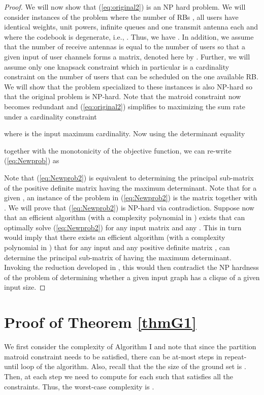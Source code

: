 \documentclass[11pt] {article}
\begin{document}
\begin{proof}
We will now show that (\ref{eq:original2}) is an NP hard problem.
We will consider instances of the problem where the number of RBs ,  all users have identical weights, unit powers, infinite queues and one transmit antenna each and where the codebook  is degenerate, i.e., .  Thus, we have . In addition, we assume that the number of receive antennas is equal to the number of users  so that a given  input of user channels forms a  matrix, denoted here by . Further, we will assume only one knapsack constraint which in particular is a cardinality constraint on the number of users that can be scheduled on the one available RB. We will show that the problem specialized to these instances is also NP-hard so that the original problem is NP-hard.
Note that the matroid constraint now becomes redundant and (\ref{eq:original2}) simplifies to  maximizing the sum rate under a cardinality constraint

where  is the input maximum cardinality.
Now using the determinant equality

together with the monotonicity of the objective function, we can re-write (\ref{eq:Newprob}) as

   Note that (\ref{eq:Newprob2}) is equivalent to determining the  principal sub-matrix of the positive definite matrix  having the maximum determinant. Note that for a given , an instance of the problem in (\ref{eq:Newprob2}) is the matrix  together with . We will prove that (\ref{eq:Newprob2}) is NP-hard via contradiction.
Suppose now that an efficient algorithm (with a complexity polynomial in ) exists that can optimally solve (\ref{eq:Newprob2}) for any input  matrix  and any .
This in turn would imply that there exists an efficient algorithm (with a complexity polynomial in )
that for any input  and any    positive definite matrix , can determine the   principal sub-matrix  of   having the maximum determinant. Invoking the reduction developed in \cite{ko:algo}, this would then contradict the NP hardness of the problem of determining whether a given input graph has a clique of a given input size.\end{proof}


\section{Proof of Theorem \ref{thmG1}}\label{app:thmG1}
We first consider the complexity of Algorithm I  and note that since the partition matroid constraint needs to be satisfied, there can be at-most  steps in repeat-until loop of the algorithm.
Also, recall that the  the size of the ground set  is . Then,  at each step we need to compute  for each  such that  satisfies all the constraints. Thus, the   worst-case complexity is .
\end{document}
